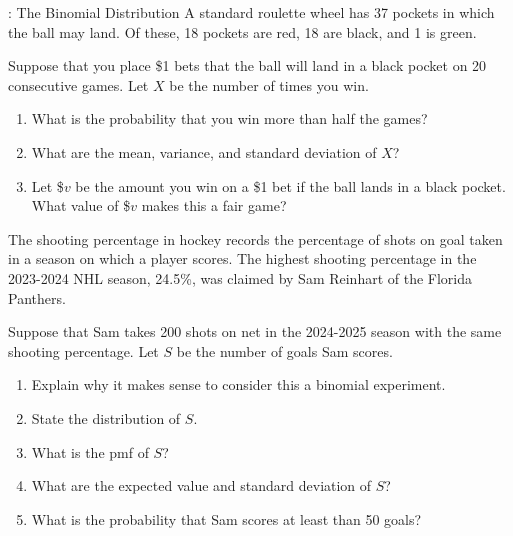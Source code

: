 \begin{frame}

  \begin{block}{\examplectd: The Binomial Distribution}
    A standard roulette wheel has 37 pockets in which the ball may land. Of these, 18 pockets are red, 18 are black, and 1 is green.

    \bigskip
    
    Suppose that you place \$1 bets that the ball will land in a black pocket on 20 consecutive games. Let $X$ be the number of times you win.
    
    \begin{enumerate}[label=\alph*),start=5]
    \item What is the probability that you win more than half the games?
    \item What are the mean, variance, and standard deviation of $X$?
    \item Let \$$v$ be the amount you win on a \$1 bet if the ball lands in a black pocket. What value of \$$v$ makes this a fair game?
    \end{enumerate}
    
  \end{block}
\end{frame}

\begin{frame}

\begin{block}{\exercise}
The shooting percentage in hockey records the percentage of shots on goal taken in a season on which a player scores. The highest shooting percentage in the 2023-2024 NHL season, 24.5\%, was claimed by Sam Reinhart of the Florida Panthers.

Suppose that Sam takes 200 shots on net in the 2024-2025 season with the same shooting percentage. Let $S$ be the number of goals Sam scores. 

\begin{enumerate}[label=\alph*),start=1]
\item Explain why it makes sense to consider this a binomial experiment.
\item State the distribution of $S$.
\item What is the pmf of $S$?
\item What are the expected value and standard deviation of $S$?
\item What is the probability that Sam scores at least than 50 goals?
\end{enumerate}
\end{block}
\end{frame}



